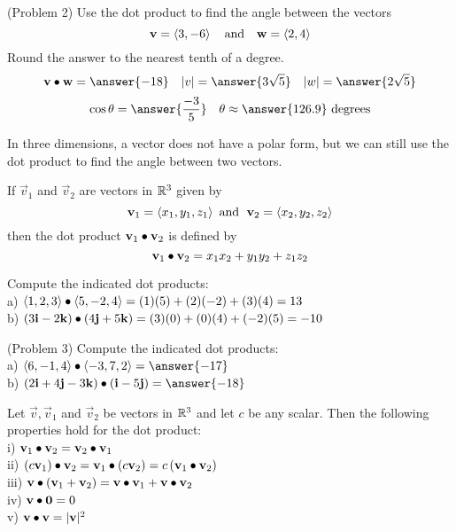 \documentclass[handout]{ximera}
\begin{document}
\begin{problem}(Problem 2) Use the dot product to find the angle between the vectors 
\[
\mathbf v = \left\langle 3,-6\right\rangle \quad \text{and} \quad \mathbf w = \left\langle 2,4\right\rangle
\]
Round the answer to the nearest tenth of a degree.\\
\[
\vec v \dotp \vec w = \answer{-18} \quad |v| = \answer{3\sqrt{5}} \quad |w| = \answer{2\sqrt{5}}
\]
\[
\cos \theta = \answer{\frac{-3}{5}} \quad \theta \approx \answer{126.9} \text{ degrees}
\]
\end{problem}


In three dimensions, a vector does not have a polar form, but we can still use the dot product to find the angle between two vectors.
\begin{definition}
If $\vec{v}_1$ and $\vec{v}_2$ are vectors in $\mathbb R^3$ given by
\[
\mathbf{v}_1 = \left\langle x_1, y_1, z_1\right\rangle \text{  and   } \;\mathbf{v}_2 = \left\langle x_2, y_2, z_2\right\rangle
\]
then the dot product $\mathbf{v}_1 \bullet \mathbf{v}_2$ is defined by
\[
\mathbf{v}_1 \bullet \mathbf{v}_2 = x_1x_2 + y_1y_2 + z_1z_2
\]
\end{definition}

\begin{example}[Example 3]
Compute the indicated dot products:\\
a) $\left\langle 1, 2, 3\right\rangle \bullet \left\langle 5, -2, 4\right\rangle = (1)(5)+ (2)(-2) + (3)(4) = 13$\\
b) $\left(3\mathbf{i} - 2\mathbf{k}\right) \bullet \left(4\mathbf{j} + 5\mathbf{k}\right) = (3)(0) + (0)(4) + (-2)(5) = -10$
\end{example}

\begin{problem}(Problem 3)
Compute the indicated dot products:\\
a) $\vector{6, -1, 4} \dotp \vector{-3, 7, 2} = \answer{-17}$\\
b) $\left(2\vec{i} + 4\vec{j} - 3\vec{k}\right) \dotp \left(\vec{i} -5\vec{j}\right) = \answer{-18}$
\end{problem}

\begin{proposition}
Let $\vec{v} , \vec{v}_1 $ and $ \vec{v}_2$ be vectors in $\mathbb R^3$ and let $c$ be any scalar. 
Then the following properties hold for the dot product:\\
i) $\mathbf{v}_1 \bullet \mathbf{v}_2 =\mathbf{v}_2 \bullet \mathbf{v}_1$\\
ii) $\left(c\mathbf{v}_1\right) \bullet \mathbf{v}_2 =\mathbf{v}_1 \bullet \left(c\mathbf{v}_2\right) = c\left(\mathbf{v}_1 \bullet \mathbf{v}_2\right)$\\
iii)  $\mathbf{v} \bullet \left(\mathbf{v}_1 +\mathbf{v}_2\right) =\mathbf{v} \bullet\mathbf{v}_1 +\mathbf{v}\bullet \mathbf{v}_2$\\
iv) $\mathbf{v} \bullet \mathbf{0} = 0$\\
v) $\mathbf{v} \bullet \mathbf{v} = |\mathbf{v}|^2$
\end{proposition}
\end{document}
